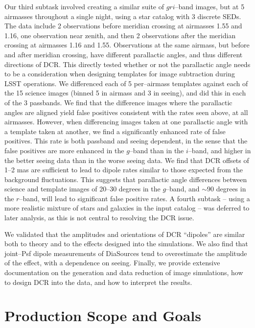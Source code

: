 \documentclass[prd, nofootinbib, floatfix, 11pt, tightenlines, times]{article}
\begin{document}
Our third subtask involved creating a similar suite of $gri$--band
images, but at 5 airmasses throughout a single night, using a star
catalog with 3 discrete SEDs.  The data include 2 observations before
meridian crossing at airmasses 1.55 and 1.16, one observation near
zenith, and then 2 observations after the meridian crossing at
airmasses 1.16 and 1.55.  Observations at the same airmass, but before
and after meridian crossing, have different parallactic angles, and
thus different directions of DCR.  This directly tested whether or not
the parallactic angle needs to be a consideration when designing
templates for image subtraction during LSST operations.  We
differenced each of 5 per--airmass templates against each of the 15
science images (binned 5 in airmass and 3 in seeing), and did this in
each of the 3 passbands.  We find that the difference images where the
parallactic angles are aligned yield false positives consistent with
the rates seen above, at all airmasses.  However, when differencing
images taken at one parallactic angle with a template taken at
another, we find a significantly enhanced rate of false positives.
This rate is both passband and seeing dependent, in the sense that the
false positives are more enhanced in the $g$--band than in the
$i$--band, and higher in the better seeing data than in the worse
seeing data.  We find that DCR offsets of 1--2 mas are sufficient to
lead to dipole rates similar to those expected from the background
fluctuations.  This suggests that parallactic angle differences
between science and template images of 20--30 degrees in the
$g$--band, and $\sim 90$ degrees in the $r$--band, will lead to
significant false positive rates.  A fourth subtask -- using a more
realistic mixture of stars and galaxies in the input catalog -- was
deferred to later analysis, as this is not central to resolving the
DCR issue.

We validated that the amplitudes and orientations of DCR ``dipoles''
are similar both to theory and to the effects designed into the
simulations.  We also find that joint--Psf dipole measurements of
DiaSources tend to overestimate the amplitude of the effect, with a
dependence on seeing.  Finally, we provide extensive documentation on
the generation and data reduction of image simulations, how to design
DCR into the data, and how to interpret the results.

\clearpage
\tableofcontents
\clearpage

\section{Production Scope and Goals}
\end{document}
